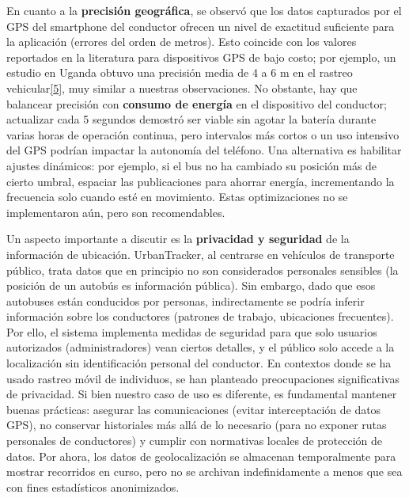 En cuanto a la \textbf{precisión geográfica}, se observó que los datos capturados por el GPS del smartphone del conductor ofrecen un nivel de exactitud suficiente para la aplicación (errores del orden de metros). Esto coincide con los valores reportados en la literatura para dispositivos GPS de bajo costo; por ejemplo, un estudio en Uganda obtuvo una precisión media de 4 a 6 m en el rastreo vehicular\href{https://fliphtml5.com/lqsof/cdpg/Art\%C3\%ADculos/\#:~:text=sistema,a\%206\%20metros\%2C\%20una\%20latencia}{{[}5{]}}, muy similar a nuestras observaciones. No obstante, hay que balancear precisión con \textbf{consumo de energía} en el dispositivo del conductor; actualizar cada 5 segundos demostró ser viable sin agotar la batería durante varias horas de operación continua, pero intervalos más cortos o un uso intensivo del GPS podrían impactar la autonomía del teléfono. Una alternativa es habilitar ajustes dinámicos: por ejemplo, si el bus no ha cambiado su posición más de cierto umbral, espaciar las publicaciones para ahorrar energía, incrementando la frecuencia solo cuando esté en movimiento. Estas optimizaciones no se implementaron aún, pero son recomendables.

Un aspecto importante a discutir es la \textbf{privacidad y seguridad} de la información de ubicación. UrbanTracker, al centrarse en vehículos de transporte público, trata datos que en principio no son considerados personales sensibles (la posición de un autobús es información pública). Sin embargo, dado que esos autobuses están conducidos por personas, indirectamente se podría inferir información sobre los conductores (patrones de trabajo, ubicaciones frecuentes). Por ello, el sistema implementa medidas de seguridad para que solo usuarios autorizados (administradores) vean ciertos detalles, y el público solo accede a la localización sin identificación personal del conductor. En contextos donde se ha usado rastreo móvil de individuos, se han planteado preocupaciones significativas de privacidad. Si bien nuestro caso de uso es diferente, es fundamental mantener buenas prácticas: asegurar las comunicaciones (evitar interceptación de datos GPS), no conservar historiales más allá de lo necesario (para no exponer rutas personales de conductores) y cumplir con normativas locales de protección de datos. Por ahora, los datos de geolocalización se almacenan temporalmente para mostrar recorridos en curso, pero no se archivan indefinidamente a menos que sea con fines estadísticos anonimizados.

